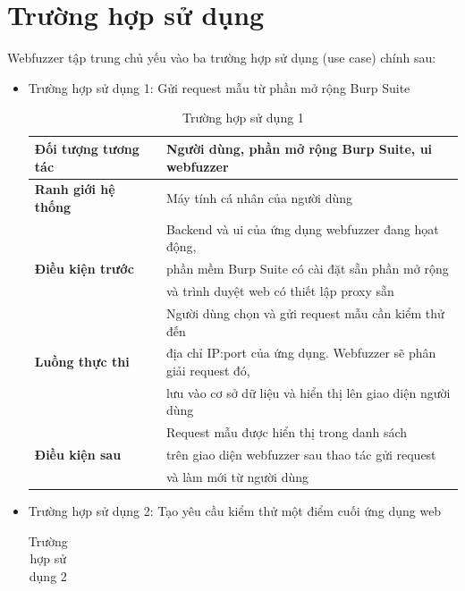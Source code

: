 \section{Trường hợp sử dụng}
Webfuzzer tập trung chủ yếu vào ba trường hợp sử dụng (use case) chính sau:
\begin{itemize}
    \item Trường hợp sử dụng 1: Gửi request mẫu từ phần mở rộng Burp Suite
    \begin{table}[ht]
        \centering
        \caption{Trường hợp sử dụng 1}
        \label{tab:use-case-1}
        \begin{tabular}[ht]{lll}
            \toprule[1pt]\midrule[0.3pt]
                \textbf{Đối tượng tương tác}& &Người dùng, phần mở rộng Burp Suite, \acrshort{ui} webfuzzer\\
            \midrule
                \textbf{Ranh giới hệ thống}& &Máy tính cá nhân của người dùng\\
            \midrule
                {}& &Backend và \acrshort{ui} của ứng dụng webfuzzer đang họat động,\\
                \textbf{Điều kiện trước}{}& &phần mềm Burp Suite có cài đặt sẵn phần mở rộng\\
                {}& &và trình duyệt web có thiết lập proxy sẵn\\
            \midrule
                {}& &Người dùng chọn và gửi request mẫu cần kiểm thử đến\\
                \textbf{Luồng thực thi}& &địa chỉ IP:port của ứng dụng. Webfuzzer sẽ phân giải request đó,\\
                {}& &lưu vào cơ sở dữ liệu và hiển thị lên giao diện người dùng\\
            \midrule
                {}& &Request mẫu được hiển thị trong danh sách \\
                \textbf{Điều kiện sau}& &trên giao diện webfuzzer sau thao tác gửi request\\
                {}& &và làm mới từ người dùng\\
            \midrule[0.3pt]\bottomrule[1pt]
        \end{tabular}
    \end{table}
    \FloatBarrier
    \item Trường hợp sử dụng 2: Tạo yêu cầu kiểm thử một điểm cuối ứng dụng web
    \begin{table}[ht]
        \centering
        \caption{Trường hợp sử dụng 2}
        \label{tab:use-case-2}
        \begin{tabular}[ht]{lll}

\end{tabular}
\end{table}
\end{itemize}

